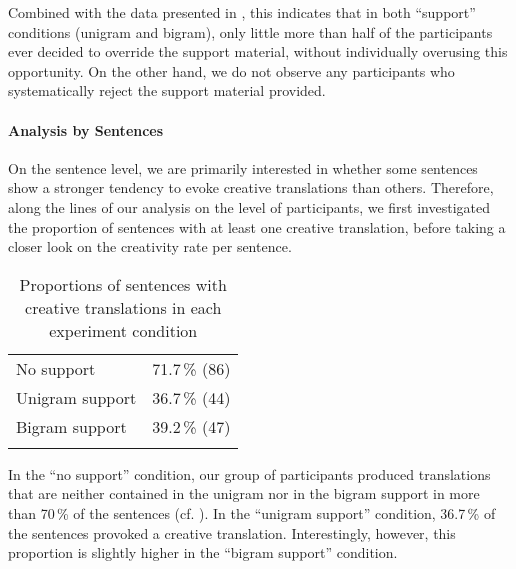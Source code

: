 \documentclass[output=paper]{LSP/langsci}
\begin{document}
Combined with the data presented in
, this indicates that in both
``support'' conditions (unigram and bigram), only little more than half of
the participants ever decided to override the support material,
without individually overusing this opportunity. On the other hand, we
do not observe any participants who systematically reject the support
material provided.


\paragraph{Analysis by Sentences} %



On the sentence level, we are primarily interested in whether
some sentences show a stronger tendency to evoke creative
translations than others. Therefore, along the lines of our analysis
on the level of participants, we first investigated the proportion of
sentences with at least one creative translation, before taking a
closer look on the creativity rate per sentence.

\begin{table}%
  \begin{tabular*}{\textwidth}{@{\extracolsep{\fill}}lr@{}}
    \lsptoprule
\multicolumn{2}{r@{}}{Sentences with $\geq 1$ creative translation}\\
    \midrule
    No support & 71.7\,\% \quad (86)\\
    Unigram support & 36.7\,\% \quad (44)\\
    Bigram support & 39.2\,\% \quad (47)\\
    \lspbottomrule
  \end{tabular*}
  \caption{Proportions of sentences with creative translations in each experiment condition}
  \label{tab:creative-sentences}
\end{table}

In the ``no support'' condition, our group of participants produced 
translations that are neither contained in the unigram nor in the 
bigram support in more than 70\,\% of the sentences (cf. ). In the ``unigram support''
condition, 36.7\,\% of the sentences provoked a creative translation.
Interestingly, however, this proportion is slightly higher in the 
``bigram support'' condition. %
\end{document}
